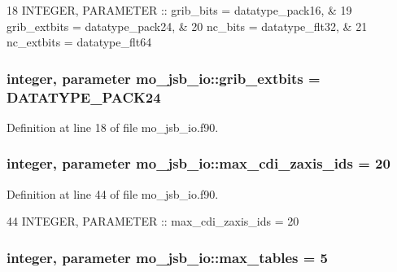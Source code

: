 \begin{DoxyCode}
18   \textcolor{keywordtype}{INTEGER}, \textcolor{keywordtype}{PARAMETER} :: grib\_bits     = datatype\_pack16, &
19                         grib\_extbits  = datatype\_pack24, &
20                         nc\_bits       = datatype\_flt32,  &
21                         nc\_extbits    = datatype\_flt64
\end{DoxyCode}
\hypertarget{namespacemo__jsb__io_a63d67a0c59ef07ed57100a79ecd9a97f}{}
\subsubsection[{grib\+\_\+extbits}]{\setlength{\rightskip}{0pt plus 5cm}integer, parameter mo\+\_\+jsb\+\_\+io\+::grib\+\_\+extbits = D\+A\+T\+A\+T\+Y\+P\+E\+\_\+\+P\+A\+C\+K24}\label{namespacemo__jsb__io_a63d67a0c59ef07ed57100a79ecd9a97f}


Definition at line 18 of file mo\+\_\+jsb\+\_\+io.\+f90.

\hypertarget{namespacemo__jsb__io_a5ec7d03d66e8d6e79f41665e227be609}{}
\subsubsection[{max\+\_\+cdi\+\_\+zaxis\+\_\+ids}]{\setlength{\rightskip}{0pt plus 5cm}integer, parameter mo\+\_\+jsb\+\_\+io\+::max\+\_\+cdi\+\_\+zaxis\+\_\+ids = 20}\label{namespacemo__jsb__io_a5ec7d03d66e8d6e79f41665e227be609}


Definition at line 44 of file mo\+\_\+jsb\+\_\+io.\+f90.


\begin{DoxyCode}
44   \textcolor{keywordtype}{INTEGER}, \textcolor{keywordtype}{PARAMETER} :: max\_cdi\_zaxis\_ids = 20
\end{DoxyCode}
\hypertarget{namespacemo__jsb__io_a7c89ecf533d68304c7e50b8c2f367dd5}{}
\subsubsection[{max\+\_\+tables}]{\setlength{\rightskip}{0pt plus 5cm}integer, parameter mo\+\_\+jsb\+\_\+io\+::max\+\_\+tables = 5}\label{namespacemo__jsb__io_a7c89ecf533d68304c7e50b8c2f367dd5}


